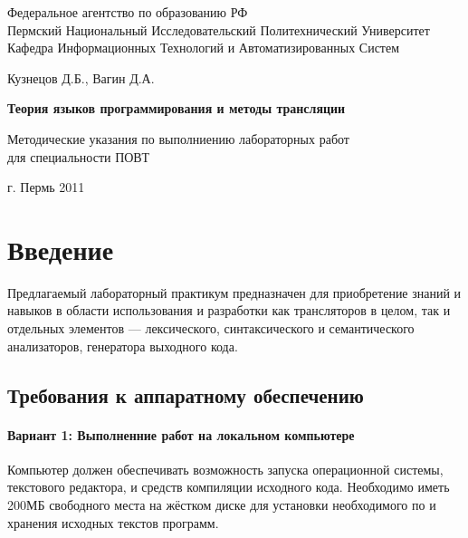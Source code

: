 \documentclass[a4paper,12pt]{article}
\begin{document}
\begin{titlepage}
\newpage

\begin{center}
Федеральное агентство по образованию РФ\\
Пермский Национальный Исследовательский Политехнический Университет\\
Кафедра Информационных Технологий и Автоматизированных Систем
\end{center}

\vspace{8em}

\begin{center}
\Large Кузнецов Д.Б., Вагин Д.А.
\end{center}

\vspace{2em}

\begin{center}
\Huge \textbf{Теория языков программирования и методы трансляции}
\end{center}
\begin{center}
Методические указания по выполниению лабораторных работ\\
для специальности ПОВТ
\end{center}

\vspace{\fill}

\begin{center}
г. Пермь 2011
\end{center}

\end{titlepage}

\newpage
\section{Введение}
Предлагаемый лабораторный практикум предназначен для  приобретение знаний и навыков в области использования и разработки как трансляторов в целом, так и отдельных элементов — лексического, синтаксического и семантического анализаторов, генератора выходного кода. 

\subsection{Требования к аппаратному обеспечению}

\paragraph{Вариант 1: Выполненние работ на локальном компьютере}
Компьютер должен обеспечивать возможность запуска операционной системы, текстового редактора, и средств компиляции исходного кода. Необходимо иметь 200МБ свободного места на жёстком диске для установки необходимого по и хранения исходных текстов программ.
\end{document}
